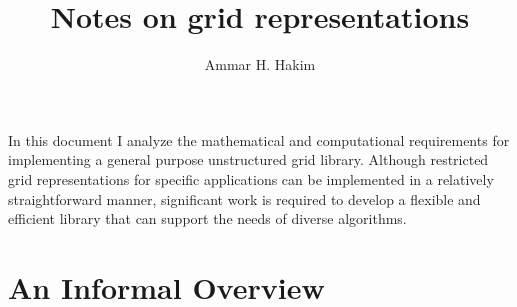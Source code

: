 \documentclass[11pt, reqno]{amsart}
\title[Grid Representation]{Notes on grid representations}%
\author{Ammar H. Hakim}%
\date{}
\theoremstyle{definition}
\begin{document}
\maketitle




In this document I analyze the mathematical and computational
requirements for implementing a general purpose unstructured grid
library. Although restricted grid representations for specific
applications can be implemented in a relatively straightforward
manner, significant work is required to develop a flexible and
efficient library that can support the needs of diverse algorithms.


\section{An Informal Overview}
\end{document}
